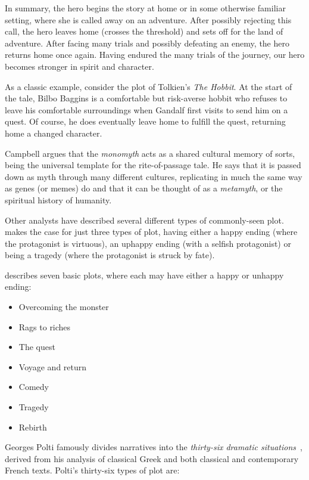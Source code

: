 \documentclass[11pt]{report}
\begin{document}
In summary, the hero begins the story at home or in some otherwise familiar
setting, where she is called away on an adventure. After possibly rejecting this
call, the hero leaves home (crosses the threshold) and sets off for the land of adventure. After facing
many trials and possibly defeating an enemy, the hero returns home once again.
Having endured the many trials of the journey, our hero becomes stronger in spirit
and character.

As a classic example, consider the plot of Tolkien's \emph{The Hobbit}. At the
start of the tale, Bilbo Baggins is a comfortable but risk-averse hobbit who
refuses to leave his comfortable surroundings when Gandalf first visits to
send him on a quest. Of course, he does eventually leave home to fulfill the
quest, returning home a changed character.

Campbell argues that the \emph{monomyth} acts as a shared cultural memory of
sorts, being the universal template for the rite-of-passage tale. He says that
it is passed down as myth through many different cultures, replicating in much the same way
as genes (or memes) do and that it can be thought of as a \emph{metamyth}, or the
spiritual history of humanity.

Other analysts have described several different types of commonly-seen plot.
\citet{harris1959basic} makes the case for just three types of plot, having
either a happy ending (where the protagonist is virtuous), an uphappy ending
(with a selfish protagonist) or being a tragedy (where the protagonist is struck
by fate).

\citet{booker2004seven} describes seven basic plots, where each may have either a
happy or unhappy ending:
\begin{itemize}
  \item Overcoming the monster
  \item Rags to riches
  \item The quest
  \item Voyage and return
  \item Comedy
  \item Tragedy
  \item Rebirth
\end{itemize}

Georges Polti famously divides narratives into the \emph{thirty-six dramatic
  situations}~\citep{polti1921thirty}, derived from his analysis of classical
Greek and both classical and contemporary French texts. Polti's thirty-six types
of plot are:
\end{document}
